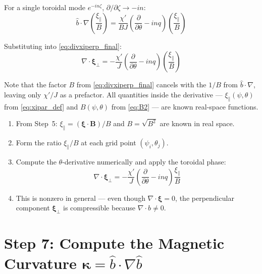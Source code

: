 \documentclass[12pt,a4paper]{article}
\newcommand{\bxi}{\boldsymbol{\xi}}
\begin{document}
For a single toroidal mode $e^{-in\zeta}$, $\partial/\partial\zeta \to -in$:
\begin{equation}
    \hat{b}\cdot\nabla\!\left(\frac{\xi_\parallel}{B}\right)
    = \frac{\chi'}{BJ}\!\left(\frac{\partial}{\partial\theta} - inq\right)\!\left(\frac{\xi_\parallel}{B}\right)
\end{equation}

Substituting into \eqref{eq:divxiperp_final}:
\begin{equation}
    \boxed{
    \nabla\cdot\bxi_\perp
    = -\frac{\chi'}{J}\!\left(\frac{\partial}{\partial\theta} - inq\right)\!\left(\frac{\xi_\parallel}{B}\right)
    }
    \label{eq:divxiperp_explicit}
\end{equation}

Note that the factor $B$ from \eqref{eq:divxiperp_final} cancels with the $1/B$ from $\hat{b}\cdot\nabla$, leaving only $\chi'/J$ as a prefactor. All quantities inside the derivative --- $\xi_\parallel(\psi,\theta)$ from \eqref{eq:xipar_def} and $B(\psi,\theta)$ from \eqref{eq:B2} --- are known real-space functions.

\begin{tcolorbox}[colback=green!5!white, colframe=green!60!black, title=\textbf{Summary: Computing $\nabla\cdot\bxi_\perp$}]
\begin{enumerate}
    \item From Step~5: $\xi_\parallel = (\bxi\cdot\mathbf{B})/B$ and $B = \sqrt{B^2}$ are known in real space.
    \item Form the ratio $\xi_\parallel/B$ at each grid point $(\psi_i, \theta_j)$.
    \item Compute the $\theta$-derivative numerically and apply the toroidal phase:
    \begin{equation*}
        \nabla\cdot\bxi_\perp = -\frac{\chi'}{J}\!\left(\frac{\partial}{\partial\theta} - inq\right)\!\frac{\xi_\parallel}{B}
    \end{equation*}
    \item This is nonzero in general --- even though $\nabla\cdot\boldsymbol{\xi}=0$, the perpendicular component $\bxi_\perp$ is compressible because $\nabla\cdot\hat{b}\neq 0$.
\end{enumerate}
\end{tcolorbox}

\section{Step 7: Compute the Magnetic Curvature $\bm{\kappa} = \hat{b}\cdot\nabla\hat{b}$}
\end{document}
